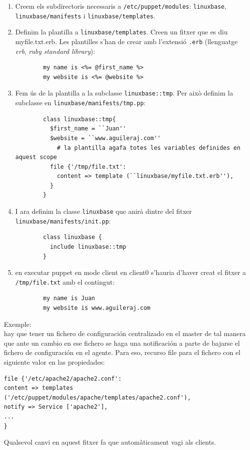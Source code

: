 \documentclass[a4paper]{article}
\begin{document}
\begin{enumerate}
	\item Creem els subdirectoris necessaris a \verb+/etc/puppet/modules+: \verb+linuxbase+, \verb+linuxbase/manifests+ i \verb+linuxbase/templates+.
	\item Definim la plantilla a \verb+linuxbase/templates+. Creen un fitxer que es diu myfile.txt.erb. Les plantilles s'han de crear amb l'extensió \verb+.erb+ (llenguatge \textit{erb}, \textit{ruby standard library}):
		\begin{verbatim}
		my name is <%= @first_name %>
		my website is <%= @website %>
		\end{verbatim}
	\item Fem ús de la plantilla a la subclasse \verb+linuxbase::tmp+. Per això definim la subclasse en \verb+linuxbase/manifests/tmp.pp+:
		\begin{verbatim}
		class linuxbase::tmp{
		  $first_name = ``Juan''
		  $website = ``www.aguileraj.com''
			# la plantilla agafa totes les variables definides en aquest scope
		  file {'/tmp/file.txt':
		    content => template (``linuxbase/myfile.txt.erb''),
		  }
		}
		\end{verbatim}
	\item I ara definim la classe \verb+linuxbase+ que anirà dintre del fitxer \verb+linuxbase/manifests/init.pp+:
		\begin{verbatim}
		class linuxbase {
		  include linuxbase::tmp
		}
		\end{verbatim}
	\item en executar puppet en mode client en client0 s'hauria d'haver creat el fitxer a \verb+/tmp/file.txt+ amb el contingut:
		\begin{verbatim}
		my name is Juan
		my website is www.aguileraj.com
		\end{verbatim}
\end{enumerate}
Exemple:\\
hay que tener un fichero de configuración centralizado en el master de tal manera que ante un cambio en ese fichero se haga una notificación a parte de bajarse el fichero de configuración en el agente. Para eso, recurso file para el fichero con el siguiente valor en las propiedades:
\begin{verbatim}
file {'/etc/apache2/apache2.conf':
content => templates ('/etc/puppet/modules/apache/templates/apache2.conf'),
notify => Service ['apache2'],
...
}
\end{verbatim}
Qualsevol canvi en aquest fitxer fa que automàticament vagi als clients.
\end{document}

